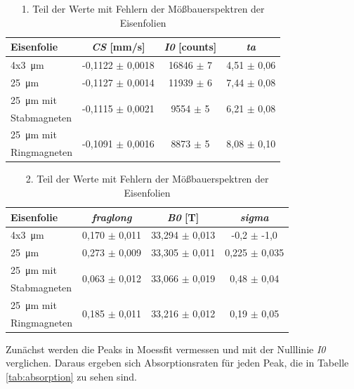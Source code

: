 \documentclass[german, %
parskip=full, %
bibliography=totoc, %
]{scrartcl}
\begin{document}
\begin{table}[ht]
\centering
\begin{tabular}[h]{l|c|c|c}
Eisenfolie & \textit{CS} [mm/s] & \textit{I0} [counts] & \textit{ta} \\ \hline 
4x\SI{3}{\micro\meter} & -0,1122 $\pm$ 0,0018 & 16846 $\pm$ 7 & 4,51 $\pm$ 0,06 \\ \hline
\SI{25}{\micro\meter} & -0,1127 $\pm$ 0,0014 & 11939 $\pm$ 6 & 7,44 $\pm$ 0,08  \\ \hline
\SI{25}{\micro\meter} mit & \multirow{2}{*}{-0,1115 $\pm$ 0,0021} & \multirow{2}{*}{9554 $\pm$ 5} & \multirow{2}{*}{6,21 $\pm$ 0,08} \\ 
Stabmagneten & & & \\ \hline
\SI{25}{\micro\meter} mit & \multirow{2}{*}{-0,1091 $\pm$ 0,0016} & \multirow{2}{*}{8873 $\pm$ 5} & \multirow{2}{*}{8,08 $\pm$ 0,10} \\  
Ringmagneten & & & 
\end{tabular}
\caption{1. Teil der Werte mit Fehlern der Mößbauerspektren der Eisenfolien}
\label{tab:werteeisen1}
\end{table}
\begin{table}[ht]
\centering
\begin{tabular}[h]{l|c|c|c}
Eisenfolie & \textit{fraglong} & \textit{B0} [T] & \textit{sigma} \\ \hline 
4x\SI{3}{\micro\meter} & 0,170 $\pm$ 0,011 & 33,294 $\pm$ 0,013 & -0,2 $\pm$ -1,0 \\ \hline
\SI{25}{\micro\meter} &  0,273 $\pm$ 0,009 & 33,305 $\pm$ 0,011 & 0,225 $\pm$ 0,035 \\ \hline
\SI{25}{\micro\meter} mit & \multirow{2}{*}{0,063 $\pm$ 0,012} & \multirow{2}{*}{33,066 $\pm$ 0,019} & \multirow{2}{*}{0,48 $\pm$ 0,04} \\ 
Stabmagneten & & & \\ \hline
\SI{25}{\micro\meter} mit & \multirow{2}{*}{0,185 $\pm$ 0,011} & \multirow{2}{*}{33,216 $\pm$ 0,012} & \multirow{2}{*}{0,19 $\pm$ 0,05} \\  
Ringmagneten & & & 
\end{tabular}
\caption{2. Teil der Werte mit Fehlern der Mößbauerspektren der Eisenfolien}
\label{tab:werteeisen2}
\end{table}

Zunächst werden die Peaks in Moessfit vermessen und mit der Nulllinie \textit{I0} verglichen. Daraus ergeben sich Absorptionsraten für jeden Peak, die in Tabelle \ref{tab:absorption} zu sehen sind.
\end{document}
